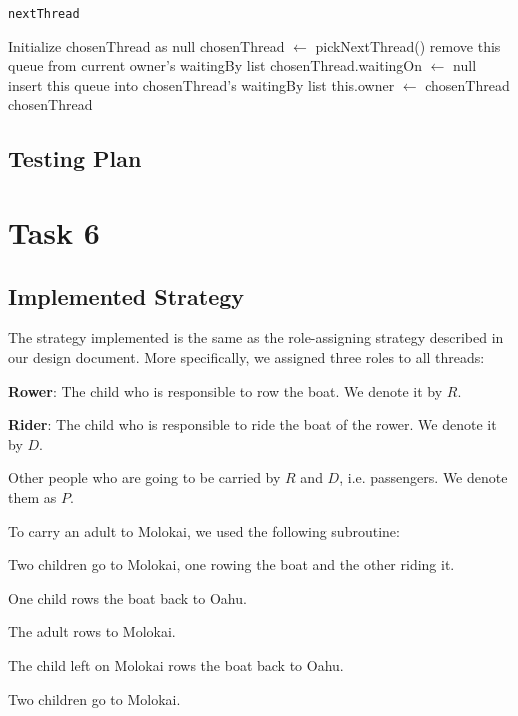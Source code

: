 \documentclass{article}
\begin{document}
\begin{spacing}{1.1}
\begin{algorithm}
  \caption{\texttt{nextThread}}
\begin{algorithmic}[1]
  \STATE Initialize chosenThread as null
  \STATE chosenThread $\leftarrow$ pickNextThread()
    \STATE remove this queue from current owner's waitingBy list
    \STATE chosenThread.waitingOn $\leftarrow$ null
    \STATE insert this queue into chosenThread's waitingBy list
  \ENDIF
  \STATE this.owner $\leftarrow$ chosenThread
\RETURN chosenThread
\end{algorithmic}
\end{algorithm}

\subsection{Testing Plan}

\section{Task 6}

\subsection{Implemented Strategy}
The strategy implemented is the same as the role-assigning strategy described in our design document. More specifically, we assigned three roles to all threads:
\begin{asparaitem}
  \item \textbf{Rower}: The child who is responsible to row the boat. We denote it by $R$.\\
  \item \textbf{Rider}: The child who is responsible to ride the boat of the rower. We denote it by $D$.\\
  \item Other people who are going to be carried by $R$ and $D$, i.e. passengers. We denote them as $P$.\\
\end{asparaitem}

To carry an adult to Molokai, we used the following subroutine:\\
\begin{asparaitem}
  \item Two children go to Molokai, one rowing the boat and the other riding it.\\
  \item One child rows the boat back to Oahu.\\
  \item The adult rows to Molokai.\\
  \item The child left on Molokai rows the boat back to Oahu.\\
  \item Two children go to Molokai.\\
\end{asparaitem}


\end{spacing}
\end{document}
